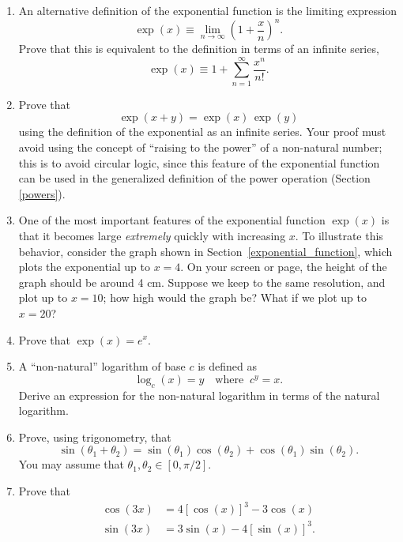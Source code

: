 \documentclass[10pt,a4paper]{article}
\begin{document}
\begin{enumerate}
  \def\labelenumi{\arabic{enumi}.}
\item
  An alternative definition of the exponential function is the limiting
  expression
  \begin{equation}
    \exp(x) \equiv \lim_{n\rightarrow\infty} \left(1+\frac{x}{n}\right)^n.
  \end{equation}
  Prove that this is equivalent to the definition in terms of an
  infinite series,
  \begin{equation}
    \exp(x) \equiv 1 + \sum_{n=1}^\infty\frac{x^n}{n!}.
  \end{equation}

\item
  Prove that
  \begin{equation}
    \exp(x+y) = \exp(x)\,\exp(y)
  \end{equation}
  using the definition of the exponential as an infinite series. Your
  proof must avoid using the concept of ``raising to the power'' of a
  non-natural number; this is to avoid circular logic, since this
  feature of the exponential function can be used in the generalized
  definition of the power operation (Section \ref{powers}).

\item
  One of the most important features of the exponential function
  $\exp(x)$ is that it becomes large \emph{extremely} quickly with
  increasing $x$. To illustrate this behavior, consider the graph
  shown in Section~\ref{exponential_function}, which plots the
  exponential up to $x = 4$.  On your screen or page, the height of
  the graph should be around 4 cm. Suppose we keep to the same
  resolution, and plot up to $x = 10$; how high would the graph be?
  What if we plot up to $x = 20$?

\item
  Prove that $\displaystyle \exp(x) = e^x.$

\item
  A ``non-natural'' logarithm of base $c$ is defined as
  \begin{equation}
    \log_c(x) = y \quad\mathrm{where}\;\; c^y = x.
  \end{equation}
  Derive an expression for the non-natural logarithm in terms of the
  natural logarithm.

\item
  Prove, using trigonometry, that
  \begin{equation}
    \sin(\theta_1 + \theta_2) = \sin(\theta_1) \cos(\theta_2) + \cos(\theta_1)\sin(\theta_2).
  \end{equation}
  You may assume that $\theta_1, \theta_2 \in [0, \pi/2].$

\item
  Prove that
  \begin{align}
    \cos(3x) &= 4[\cos(x)]^3 -3\cos(x) \\
    \sin(3x) &= 3\sin(x)-4[\sin(x)]^3.
  \end{align}
\end{enumerate}
\end{document}

